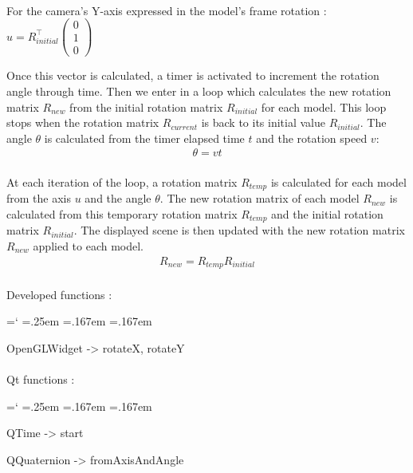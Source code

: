 \documentclass[12pt]{report}
\DeclareRobustCommand*{\ttfamily}{
  \origttfamily
  \hyphenchar\font=`\-\relax
  \fontdimen3\font=.25em\relax
  \fontdimen4\font=.167em\relax
  \fontdimen7\font=.167em\relax
}
\newenvironment{code}{\ttfamily}{}
\begin{document}
\paragraph{}
For the camera's Y-axis expressed in the model's frame rotation : $u = R_{initial}^\top \left( \begin{array}{cc}
	0 \\
    1 \\
    0 \end{array} \right)$

Once this vector is calculated, a timer is activated to increment the rotation angle through time. Then we enter in a loop which calculates the new rotation matrix $R_{new}$ from the initial rotation matrix $R_{initial}$ for each model. This loop stops when the rotation matrix $R_{current}$ is back to its initial value $R_{initial}$. The angle $\theta$ is calculated from the timer elapsed time $t$ and the rotation speed $v$:
\begin{align}
\theta = v t
\end{align}


\paragraph{}
	At each iteration of the loop, a rotation matrix $R_{temp}$ is calculated for each model from the axis $u$ and the angle $\theta$. The new rotation matrix of each model $R_{new}$ is calculated from this temporary rotation matrix $R_{temp}$ and the initial rotation matrix $R_{initial}$. The displayed scene is then updated with the new rotation matrix $R_{new}$ applied to each model.
\begin{align}
R_{new} = R_{temp} R_{initial}
\end{align}

\paragraph{}
	Developed functions :

	\begin{code}
	OpenGLWidget -> rotateX, rotateY
	\end{code}

\paragraph{}
	Qt functions :

	\begin{code}
	QTime -> start

	QQuaternion -> fromAxisAndAngle
	\end{code}
\end{document}
